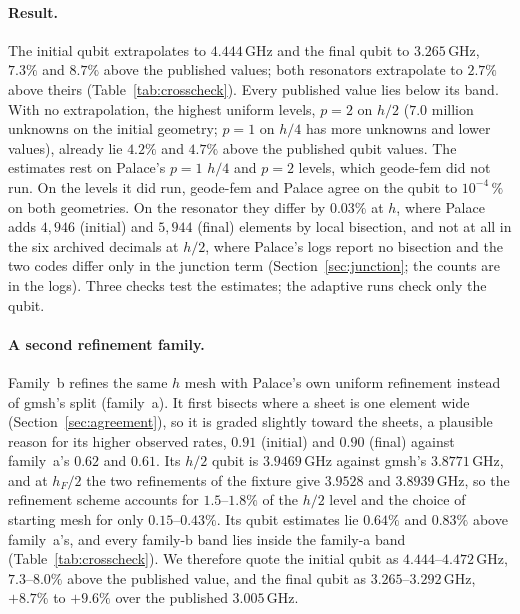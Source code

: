 \documentclass{anvil-paper}
\begin{document}
\paragraph{Result.}
The initial qubit extrapolates to $4.444$\,GHz and the final qubit to
$3.265$\,GHz, $7.3\%$ and $8.7\%$ above the published values; both
resonators extrapolate to $2.7\%$ above theirs
(Table~\ref{tab:crosscheck}). Every published value lies below its band.
With no extrapolation, the
highest uniform levels, $p = 2$ on $h/2$ ($7.0$ million unknowns on the
initial geometry; $p = 1$ on $h/4$ has more unknowns and lower values),
already lie $4.2\%$ and $4.7\%$ above the published qubit values. The
estimates rest on Palace's $p = 1$ $h/4$ and $p = 2$ levels, which
geode-fem did not run. On the levels it did run, geode-fem and Palace
agree on the qubit to $10^{-4}\,\%$ on both geometries. On the resonator
they differ by $0.03\%$ at $h$, where Palace adds $4{,}946$ (initial) and
$5{,}944$ (final) elements by local bisection, and not at all in the six
archived decimals at $h/2$, where Palace's logs report no bisection and
the two codes differ only in the junction term
(Section~\ref{sec:junction}; the counts are in the logs). Three checks
test the estimates; the adaptive runs check only the qubit.

\paragraph{A second refinement family.}
Family~b refines the same $h$ mesh with Palace's own uniform refinement
instead of gmsh's split (family~a). It first bisects where a sheet is one
element wide (Section~\ref{sec:agreement}), so it is graded slightly
toward the sheets, a plausible reason for its higher observed rates,
$0.91$ (initial) and $0.90$ (final) against family~a's $0.62$ and $0.61$.
Its $h/2$ qubit is $3.9469$\,GHz against gmsh's $3.8771$\,GHz, and at
$h_F/2$ the two refinements of the fixture give $3.9528$ and $3.8939$\,GHz, so the
refinement scheme accounts for $1.5$--$1.8\%$ of the $h/2$ level and the
choice of starting mesh for only $0.15$--$0.43\%$. Its qubit estimates lie
$0.64\%$ and $0.83\%$ above family~a's, and every family-b band lies
inside the family-a band (Table~\ref{tab:crosscheck}). We therefore quote
the initial qubit as $4.444$--$4.472$\,GHz, $7.3$--$8.0\%$ above the
published value, and the final qubit as $3.265$--$3.292$\,GHz, $+8.7\%$ to
$+9.6\%$ over the published $3.005$\,GHz.
\end{document}
